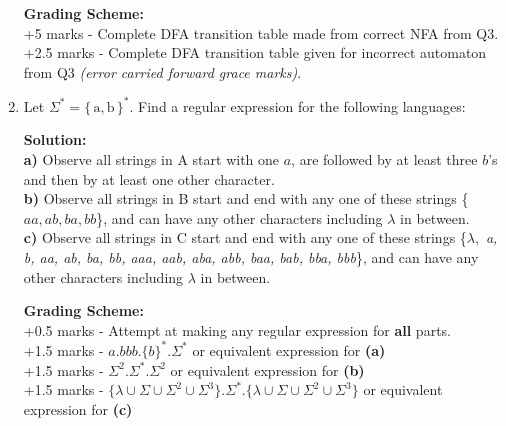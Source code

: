 \documentclass[11pt, article, oneside]{memoir}
\newcommand{\set}[1]{\{\, #1\, \}}
\DeclarePairedDelimiter\abs{\lvert}{\rvert}
\begin{document}
\begin{enumerate}
        \textbf{Grading Scheme:}
        \\+5 marks - Complete DFA transition table made from correct NFA from Q3.
        \\+2.5 marks - Complete DFA transition table given for incorrect automaton from Q3 \textit{(error carried forward grace marks)}.
        
    \item
        Let \(\Sigma^* = \set{\text{a}, \text{b}}^*\). Find a regular expression for the following languages:

        \textbf{Solution:}
        \\\textbf{a)} Observe all strings in A start with one \(a\), are followed by at least three \(b\)'s and then by at least one other character.
        \\\textbf{b)} Observe all strings in B start and end with any one of these strings \{\(aa, ab, ba, bb\)\}, and can have any other characters including \(\lambda\) in between.
        \\\textbf{c)} Observe all strings in C start and end with any one of these strings
        \{\(\lambda,\) \textit{a, b, aa, ab, ba, bb, aaa, aab, aba, abb, baa, bab, bba, bbb}\},
        and can have any other characters including \(\lambda\) in between.

        \textbf{Grading Scheme:}
        \\+0.5 marks - Attempt at making any regular expression for \textbf{all} parts.
        \\+1.5 marks - \(a.bbb.\{b\}^*.\Sigma^*\) or equivalent expression for \textbf{(a)}
        \\+1.5 marks - \(\Sigma^2.\Sigma^*.\Sigma^2\) or equivalent expression for \textbf{(b)}
        \\+1.5 marks - \(\{\lambda \cup \Sigma \cup \Sigma^2 \cup \Sigma^3\}.\Sigma^*.\{\lambda \cup \Sigma \cup \Sigma^2 \cup \Sigma^3\}\) or equivalent expression for \textbf{(c)}


\end{enumerate}
\end{document}
